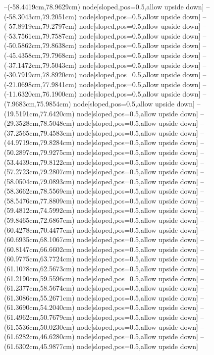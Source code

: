 --(-58.4419cm,78.9629cm) node[sloped,pos=0.5,allow upside down]{\arrowIn}
--(-58.3043cm,79.2051cm) node[sloped,pos=0.5,allow upside down]{\arrowIn}
--(-57.8919cm,79.2797cm) node[sloped,pos=0.5,allow upside down]{\arrowIn}
--(-53.7561cm,79.7587cm) node[sloped,pos=0.5,allow upside down]{\ArrowIn}
--(-50.5862cm,79.8638cm) node[sloped,pos=0.5,allow upside down]{\ArrowIn}
--(-45.4358cm,79.7968cm) node[sloped,pos=0.5,allow upside down]{\ArrowIn}
--(-37.1472cm,79.5043cm) node[sloped,pos=0.5,allow upside down]{\ArrowIn}
--(-30.7919cm,78.8920cm) node[sloped,pos=0.5,allow upside down]{\ArrowIn}
--(-21.0698cm,77.9841cm) node[sloped,pos=0.5,allow upside down]{\ArrowIn}
--(-11.6320cm,76.1900cm) node[sloped,pos=0.5,allow upside down]{\ArrowIn}
--(7.9683cm,75.9854cm) node[sloped,pos=0.5,allow upside down]{\ArrowIn}
--(19.5191cm,77.6420cm) node[sloped,pos=0.5,allow upside down]{\ArrowIn}
--(29.3528cm,78.5048cm) node[sloped,pos=0.5,allow upside down]{\ArrowIn}
--(37.2565cm,79.4583cm) node[sloped,pos=0.5,allow upside down]{\ArrowIn}
--(44.9719cm,79.8284cm) node[sloped,pos=0.5,allow upside down]{\ArrowIn}
--(50.2897cm,79.9275cm) node[sloped,pos=0.5,allow upside down]{\ArrowIn}
--(53.4439cm,79.8122cm) node[sloped,pos=0.5,allow upside down]{\ArrowIn}
--(57.2723cm,79.2807cm) node[sloped,pos=0.5,allow upside down]{\ArrowIn}
--(58.0504cm,79.0893cm) node[sloped,pos=0.5,allow upside down]{\arrowIn}
--(58.3662cm,78.5569cm) node[sloped,pos=0.5,allow upside down]{\arrowIn}
--(58.5476cm,77.8809cm) node[sloped,pos=0.5,allow upside down]{\arrowIn}
--(59.4812cm,74.5992cm) node[sloped,pos=0.5,allow upside down]{\ArrowIn}
--(59.8465cm,72.6867cm) node[sloped,pos=0.5,allow upside down]{\ArrowIn}
--(60.4278cm,70.4477cm) node[sloped,pos=0.5,allow upside down]{\ArrowIn}
--(60.6935cm,68.1067cm) node[sloped,pos=0.5,allow upside down]{\ArrowIn}
--(60.8147cm,66.6602cm) node[sloped,pos=0.5,allow upside down]{\ArrowIn}
--(60.9775cm,63.7724cm) node[sloped,pos=0.5,allow upside down]{\ArrowIn}
--(61.1078cm,62.5673cm) node[sloped,pos=0.5,allow upside down]{\ArrowIn}
--(61.2190cm,59.5596cm) node[sloped,pos=0.5,allow upside down]{\ArrowIn}
--(61.2377cm,58.5674cm) node[sloped,pos=0.5,allow upside down]{\arrowIn}
--(61.3086cm,55.2671cm) node[sloped,pos=0.5,allow upside down]{\ArrowIn}
--(61.3690cm,54.2040cm) node[sloped,pos=0.5,allow upside down]{\ArrowIn}
--(61.4962cm,50.7679cm) node[sloped,pos=0.5,allow upside down]{\ArrowIn}
--(61.5536cm,50.0230cm) node[sloped,pos=0.5,allow upside down]{\arrowIn}
--(61.6282cm,46.6280cm) node[sloped,pos=0.5,allow upside down]{\ArrowIn}
--(61.6302cm,45.9877cm) node[sloped,pos=0.5,allow upside down]{\arrowIn}
